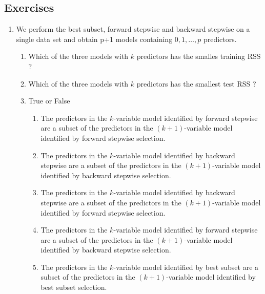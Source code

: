 \documentclass[11pt, a4paper]{article}
\begin{document}
    \subsection{Exercises}
    \begin{enumerate}
        \item We perform the best subset, forward stepwise and backward stepwise on a single data set and obtain p+1 models containing $0, 1, \ldots, p$ predictors.
        \begin{enumerate}
            \item Which of the three models with $k$ predictors has the smalles training RSS ?
            \item Which of the three models with $k$ predictors has the smallest test RSS ?
            \item True or False
            \begin{enumerate}
                \item The predictors in the $k$-variable model identified by forward stepwise are a subset of the predictors in the $(k+1)$-variable model identified by forward stepwise selection.
                \item The predictors in the $k$-variable model identified by backward stepwise are a subset of the predictors in the $(k+1)$-variable model identified by backward stepwise selection.
                \item The predictors in the $k$-variable model identified by backward stepwise are a subset of the predictors in the $(k + 1)$-variable model identified by forward stepwise selection.
                \item The predictors in the $k$-variable model identified by forward stepwise are a subset of the predictors in the $(k+1)$-variable model identified by backward stepwise selection.
                \item The predictors in the $k$-variable model identified by best subset are a subset of the predictors in the $(k + 1)$-variable model identified by best subset selection.
            \end{enumerate}
        \end{enumerate}


\end{enumerate}
\end{document}
